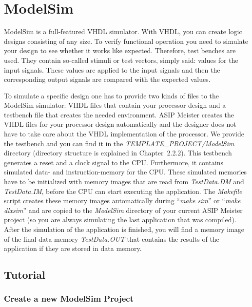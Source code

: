 \hypertarget{modelsim}{%
\chapter{ModelSim}\label{modelsim}}

ModelSim is a full-featured VHDL simulator. With VHDL, you can create
logic designs consisting of any size. To verify functional operation you
need to simulate your design to see whether it works like expected.
Therefore, test benches are used. They contain so-called stimuli or test
vectors, simply said: values for the input signals. These values are
applied to the input signals and then the corresponding output signals
are compared with the expected values.

To simulate a specific design one has to provide two kinds of files to
the ModelSim simulator: VHDL files that contain your processor design
and a testbench file that creates the needed environment. ASIP Meister
creates the VHDL files for your processor design automatically and the
designer does not have to take care about the VHDL implementation of the
processor. We provide the testbench and you can find it in the
\emph{TEM­PLATE\_­PRO­JECT/ModelSim} directory (directory structure is
explained in Chapter~2.2.2). This testbench generates a reset and a
clock signal to the CPU. Furthermore, it contains simulated data- and
instruction-memory for the CPU. These simulated memories have to be
initialized with memory images that are read from \emph{TestData.DM} and
\emph{TestData.IM}, before the CPU can start executing the application.
The \emph{Makefile} script creates these memory images automatically
during ``\emph{make sim}'' or ``\emph{make dlxsim}'' and are copied to
the \emph{ModelSim} directory of your current ASIP Meister project (so
you are always simulating the last application that was compiled). After
the simulation of the application is finished, you will find a memory
image of the final data memory \emph{TestData.OUT} that contains the
results of the application if they are stored in data memory.

\hypertarget{tutorial}{%
\section{Tutorial}\label{tutorial}}

\hypertarget{create-a-new-modelsim-project}{%
\subsection{Create a new ModelSim
Project}\label{create-a-new-modelsim-project}}

